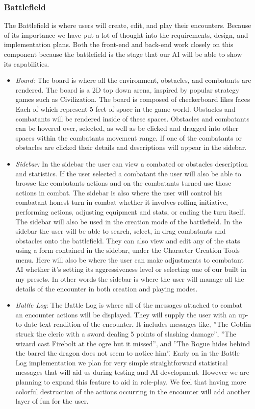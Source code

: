 \documentclass[letterpaper, 10 pt, conference]{ieeeconf}
\begin{document}
\subsubsection{Battlefield}
The Battlefield is where users will create, edit,
and play their encounters. Because of its importance we have put a lot of thought
into the requirements, design, and implementation plans. Both the front-end and
back-end work closely on this component because the battlefield is the stage
that our AI will be able to show its capabilities.
\begin{itemize}
	\item \textit{Board:} The board is where all the environment, obstacles, and combatants are rendered.
	The board is a 2D top down arena, inspired by popular strategy games
	such as Civilization. The board is composed of checkerboard likes faces Each of
	which represent 5 feet of space in the game world. Obstacles and combatants will
	be rendered inside of these spaces. Obstacles and combatants can be hovered over,
	selected, as well as be clicked and dragged into other spaces within the combatants
	movement range. If one of the combatants or obstacles are clicked their details
	and descriptions will appear in the sidebar. \\
	\item \textit{Sidebar:} In the sidebar the user can view a combated or obstacles description and statistics.
	If the user selected a combatant the user will also be able to browse the combatants
	actions and on the combatants turned use those actions in combat. The
	sidebar is also where the user will control his combatant honest turn in combat
	whether it involves rolling initiative, performing actions, adjusting equipment and
	stats, or ending the turn itself. The sidebar will also be used in the creation mode
	of the battlefield. In the sidebar the user will be able to search, select, in drag
	combatants and obstacles onto the battlefield. They can also view and edit any
	of the stats using a form contained in the sidebar, under the Character Creation
	Tools menu. Here will also be where the user can make adjustments to combatant
	AI whether it’s setting its aggressiveness level or selecting one of our built in my
	presets. In other words the sidebar is where the user will manage all the details
	of the encounter in both creation and playing modes. \\
	\item \textit{Battle Log:} The Battle Log is where all of the messages attached to combat an
	encounter actions will be displayed. They will supply the user with an up-to-date
	text rendition of the encounter. It includes messages like, ”The Goblin struck
	the cleric with a sword dealing 5 points of slashing damage”, ”The wizard cast
	Firebolt at the ogre but it missed”, and ”The Rogue hides behind the barrel the
	dragon does not seem to notice him”. Early on in the Battle Log implementation
	we plan for very simple straightforward statistical messages that will aid us during
	testing and AI development. However we are planning to expand this feature to
	aid in role-play. We feel that having more colorful destruction of the actions
	occurring in the encounter will add another layer of fun for the user.
\end{itemize}
\end{document}
